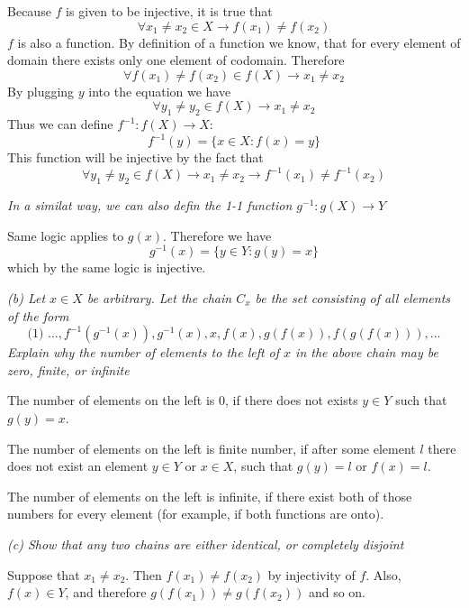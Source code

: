 \documentclass[11pt,oneside,titlepage]{book}
\begin{document}
Because $f$ is given to be injective, it is true that
$$\forall x_1 \neq x_2 \in X \to  f(x_1) \neq f(x_2)$$
$f$ is also a function.  By definition of a function we know, that for every element
of domain there exists only one element of codomain. Therefore
$$\forall f(x_1) \neq f(x_2) \in f(X) \to  x_1 \neq x_2$$
By plugging $y$ into the equation we have
$$\forall y_1 \neq y_2  \in f(X) \to  x_1 \neq x_2$$
Thus we can define $f^{-1}: f(X) \to X$:
$$f^{-1}(y) = \{x \in X: f(x) = y\}$$
This function will be injective by the fact that
$$\forall y_1 \neq y_2  \in f(X) \to  x_1 \neq x_2 \to f^{-1}(x_1) \neq f^{-1}(x_2)$$

\textit{In a similat way, we can also defin the 1-1 function $g^{-1}: g(X) \to Y$}

Same logic applies to $g(x)$. Therefore we have
$$g^{-1}(x) = \{y \in Y: g(y) = x\}$$
which by the same logic is injective.

\textit{(b) Let $x \in X$ be arbitrary. Let the chain $C_x$ be the set consisting of all
  elements of the form }
$$\text{(1) }..., f^{-1}(g^{-1}(x)), g^{-1}(x), x, f(x), g(f(x)), f(g(f(x))), ...$$
\textit{Explain why the number of elements to the left of $x$ in the above chain may be zero,
  finite, or infinite}

The number of elements on the left is 0, if there does not exists $y \in Y$ such that
$g(y) = x$.

The number of elements on the left is finite number, if after some element $l$ there
does not exist an element $y \in Y$ or $x \in X$, such that $g(y) = l$ or $f(x) = l$.

The number of elements on the left is infinite, if there exist both of those numbers
for every element (for example, if both functions are onto).







\textit{(c) Show that any two chains are either identical, or completely disjoint}

Suppose that $x_1 \neq x_2$. Then $f(x_1) \neq f(x_2)$ by injectivity of $f$.
Also, $f(x) \in Y$, and therefore $g(f(x_1)) \neq g(f(x_2))$ and so on.
\end{document}
